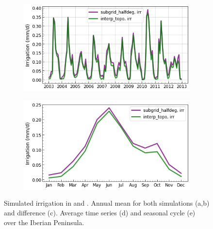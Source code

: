 \begin{figure}[htbp]
    \begin{subfigure}[b]{0.48\textwidth}
        \caption{}
        \includegraphics[width=\linewidth]{images/eval_halfdeg/time_series/irrigation_time_series.png}
    \end{subfigure}    
    \begin{subfigure}[b]{0.48\textwidth}
        \caption{}
        \includegraphics[width=\linewidth]{images/eval_halfdeg/time_series/irrigation_seasonal_cycle.png}
    \end{subfigure}

    \caption{Simulated irrigation in \std and \native. Annual mean for both simulations (a,b) and difference (c). Average time series (d) and seasonal cycle (e) over the Iberian Peninsula.}
    \label{fig:irrigation_halfdeg_eval}
\end{figure}

